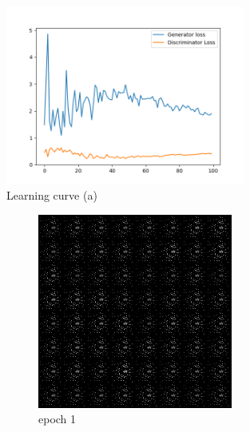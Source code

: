 \documentclass[a4paper]{article}
\theoremstyle{definition}
\newenvironment{soln}{
	\leavevmode\color{blue}\ignorespaces
}{}
\begin{document}
\begin{enumerate} [label=(\alph*)]
	      \begin{soln}
		      \begin{figure}[H]
			      \centering
			      \includegraphics[width=0.7\textwidth]{img/q1_1/loss.png}
			      \caption*{Learning curve (a)}
		      \end{figure}
		      \begin{figure}[H]
			      \centering
			      \begin{subfigure}[b]{0.3\textwidth}
				      \centering
				      \includegraphics[width=\textwidth]{img/q1_1/gen_img1.png}
				      \caption{epoch 1}
			      \end{subfigure}
			      \hfill
			      \begin{subfigure}[b]{0.3\textwidth}

\end{subfigure}
\end{figure}
\end{soln}
\end{enumerate}
\end{document}
